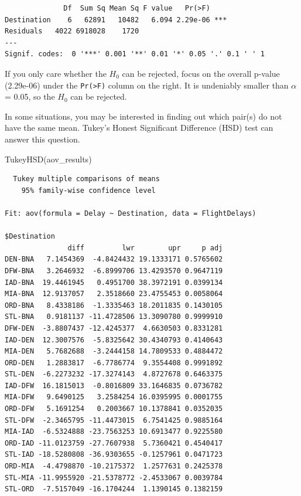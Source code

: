 \documentclass[
  letterpaper,
  DIV=11,
  numbers=noendperiod]{scrreprt}
\newenvironment{Shaded}{\begin{snugshade}}{\end{snugshade}}
\newcommand{\FunctionTok}[1]{\textcolor[rgb]{0.28,0.35,0.67}{#1}}
\newcommand{\NormalTok}[1]{\textcolor[rgb]{0.00,0.23,0.31}{#1}}
\begin{document}
\begin{verbatim}
              Df  Sum Sq Mean Sq F value   Pr(>F)    
Destination    6   62891   10482   6.094 2.29e-06 ***
Residuals   4022 6918028    1720                     
---
Signif. codes:  0 '***' 0.001 '**' 0.01 '*' 0.05 '.' 0.1 ' ' 1
\end{verbatim}

If you only care whether the \(H_{0}\) can be rejected, focus on the
overall p-value (2.29e-06) under the \texttt{Pr(\textgreater{}F)} column
on the right. It is undeniably smaller than \(\alpha\) = 0.05, so the
\(H_{0}\) can be rejected.

In some situations, you may be interested in finding out which pair(s)
do not have the same mean. Tukey's Honest Significant Difference (HSD)
test can answer this question.

\begin{Shaded}
\begin{Highlighting}[]
\FunctionTok{TukeyHSD}\NormalTok{(aov\_results)}
\end{Highlighting}
\end{Shaded}

\begin{verbatim}
  Tukey multiple comparisons of means
    95% family-wise confidence level

Fit: aov(formula = Delay ~ Destination, data = FlightDelays)

$Destination
               diff         lwr        upr     p adj
DEN-BNA   7.1454369  -4.8424432 19.1333171 0.5765602
DFW-BNA   3.2646932  -6.8999706 13.4293570 0.9647119
IAD-BNA  19.4461945   0.4951700 38.3972191 0.0399134
MIA-BNA  12.9137057   2.3518660 23.4755453 0.0058064
ORD-BNA   8.4338186  -1.3335463 18.2011835 0.1430105
STL-BNA   0.9181137 -11.4728506 13.3090780 0.9999910
DFW-DEN  -3.8807437 -12.4245377  4.6630503 0.8331281
IAD-DEN  12.3007576  -5.8325642 30.4340793 0.4140643
MIA-DEN   5.7682688  -3.2444158 14.7809533 0.4884472
ORD-DEN   1.2883817  -6.7786774  9.3554408 0.9991892
STL-DEN  -6.2273232 -17.3274143  4.8727678 0.6463375
IAD-DFW  16.1815013  -0.8016809 33.1646835 0.0736782
MIA-DFW   9.6490125   3.2584254 16.0395995 0.0001755
ORD-DFW   5.1691254   0.2003667 10.1378841 0.0352035
STL-DFW  -2.3465795 -11.4473015  6.7541425 0.9885164
MIA-IAD  -6.5324888 -23.7563253 10.6913477 0.9225580
ORD-IAD -11.0123759 -27.7607938  5.7360421 0.4540417
STL-IAD -18.5280808 -36.9303655 -0.1257961 0.0471723
ORD-MIA  -4.4798870 -10.2175372  1.2577631 0.2425378
STL-MIA -11.9955920 -21.5378772 -2.4533067 0.0039784
STL-ORD  -7.5157049 -16.1704244  1.1390145 0.1382159
\end{verbatim}
\end{document}
